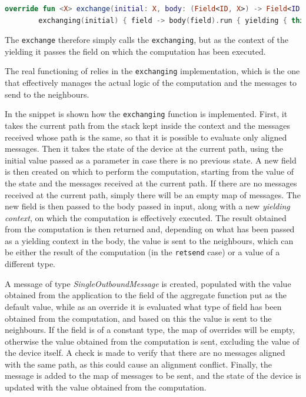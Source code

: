 \begin{lstlisting}[language=kt,label={lst:exchangeImpl},caption={The implementation of the \texttt{exchange} function.}]
override fun <X> exchange(initial: X, body: (Field<ID, X>) -> Field<ID, X>): Field<ID, X> =
        exchanging(initial) { field -> body(field).run { yielding { this } } }
\end{lstlisting}

The \texttt{exchange} therefore simply calls the \texttt{exchanging}, but as the context of the yielding it passes the
field on which the computation has been executed.

The real functioning of \xc{} relies in the \texttt{exchanging} implementation, which is the one that effectively manages
the actual logic of the computation and the messages to send to the neighbours.

In the  snippet is shown how the \texttt{exchanging} function is implemented.
First, it takes the current path from the stack kept inside the context and the messages received whose path is the same,
so that it is possible to evaluate only aligned messages.
Then it takes the state of the device at the current path, using the initial value passed as a parameter in case there is no previous state.
A new field is then created on which to perform the computation, starting from the value of the state and the messages received at the current path.
If there are no messages received at the current path, simply there will be an empty map of messages.
The new field is then passed to the body passed in input, along with a new \emph{yielding context}, on which the computation is effectively executed.
The result obtained from the computation is then returned and, depending on what has been passed as a yielding context in the body,
the value is sent to the neighbours, which can be either the result of the computation (in the \texttt{retsend} case) or a value of a different type.

A message of type \emph{SingleOutboundMessage} is created, populated with the value obtained from the application to the field
of the aggregate function put as the default value, while as an override it is evaluated what type of field has been
obtained from the computation, and based on this the value is sent to the neighbours.
If the field is of a constant type, the map of overrides will be empty, otherwise the value obtained from the computation
is sent, excluding the value of the device itself.
A check is made to verify that there are no messages aligned with the same path, as this could cause an alignment conflict.
Finally, the message is added to the map of messages to be sent, and the state of the device is updated with the value obtained from the computation.

